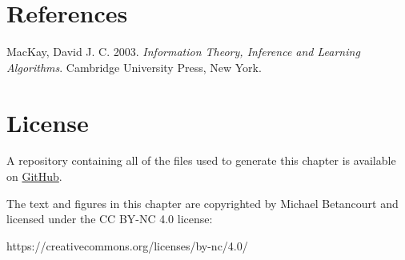 \documentclass[
  letterpaper,
  DIV=11,
  numbers=noendperiod]{scrartcl}
\newlength{\cslhangindent}
\newenvironment{CSLReferences}[2] %
 {\begin{list}{}{%
  \setlength{\itemindent}{0pt}
  \setlength{\leftmargin}{0pt}
  \setlength{\parsep}{0pt}
  \ifodd #1
   \setlength{\leftmargin}{\cslhangindent}
   \setlength{\itemindent}{-1\cslhangindent}
  \fi
  \setlength{\itemsep}{#2\baselineskip}}}
 {\end{list}}
\begin{document}
\section*{References}\label{references}

\label{refs}
\begin{CSLReferences}{1}{0}
MacKay, David J. C. 2003. \emph{Information Theory, Inference and
Learning Algorithms}. Cambridge University Press, New York.

\end{CSLReferences}

\section*{License}\label{license}

A repository containing all of the files used to generate this chapter
is available on
\href{https://github.com/betanalpha/quarto_chapters/tree/main/case_studies/window_inference}{GitHub}.

The text and figures in this chapter are copyrighted by Michael
Betancourt and licensed under the CC BY-NC 4.0 license:

https://creativecommons.org/licenses/by-nc/4.0/
\end{document}
